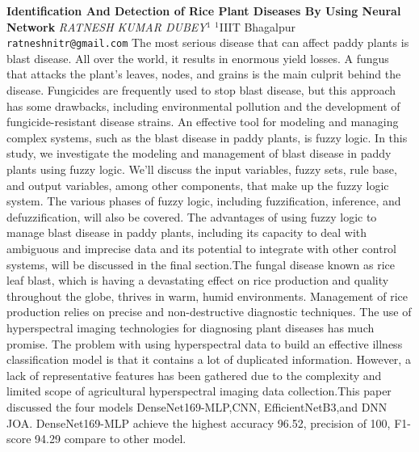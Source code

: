 
    \begin{conf-abstract}[]
        {\textbf{Identification And Detection of Rice Plant Diseases By Using Neural Network}}
        {\textit{RATNESH KUMAR DUBEY$^{1}$}}
        {$^{1}$IIIT Bhagalpur}
        {\texttt{ratneshnitr@gmail.com}}
        {The most serious disease that can affect paddy plants is blast disease. All over the world, it results in enormous yield losses. A fungus that attacks the plant's leaves, nodes, and grains is the main culprit behind the disease. Fungicides are frequently used to stop blast disease, but this approach has some drawbacks, including environmental pollution and the development of fungicide-resistant disease strains. An effective tool for modeling and managing complex systems, such as the blast disease in paddy plants, is fuzzy logic. In this study, we investigate the modeling and management of blast disease in paddy plants using fuzzy logic. We'll discuss the input variables, fuzzy sets, rule base, and output variables, among other components, that make up the fuzzy logic system. The various phases of fuzzy logic, including fuzzification, inference, and defuzzification, will also be covered. The advantages of using fuzzy logic to manage blast disease in paddy plants, including its capacity to deal with ambiguous and imprecise data and its potential to integrate with other control systems, will be discussed in the final section.The fungal disease known as rice leaf blast, which is having a devastating effect on rice production and quality throughout the globe, thrives in warm, humid environments. Management of rice production relies on precise and non-destructive diagnostic techniques. The use of hyperspectral imaging technologies for diagnosing plant diseases has much promise. The problem with using hyperspectral data to build an effective illness classification model is that it contains a lot of duplicated information. However, a lack of representative features has been gathered due to the complexity and limited scope of agricultural hyperspectral imaging data collection.This paper discussed the four models DenseNet169-MLP,CNN, EfficientNetB3,and DNN JOA. DenseNet169-MLP achieve the highest accuracy   96.52, precision of 100, F1-score 94.29 compare to other model.}
    \end{conf-abstract}
        